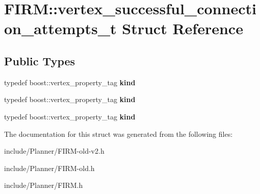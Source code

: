 \hypertarget{struct_f_i_r_m_1_1vertex__successful__connection__attempts__t}{\section{\-F\-I\-R\-M\-:\-:vertex\-\_\-successful\-\_\-connection\-\_\-attempts\-\_\-t \-Struct \-Reference}
\label{struct_f_i_r_m_1_1vertex__successful__connection__attempts__t}
}
\subsection*{\-Public \-Types}
\begin{DoxyCompactItemize}
\item 
\hypertarget{struct_f_i_r_m_1_1vertex__successful__connection__attempts__t_a733ba6f888f1adc641d746377eb13eec}{typedef boost\-::vertex\-\_\-property\-\_\-tag {\bfseries kind}}\label{struct_f_i_r_m_1_1vertex__successful__connection__attempts__t_a733ba6f888f1adc641d746377eb13eec}

\item 
\hypertarget{struct_f_i_r_m_1_1vertex__successful__connection__attempts__t_a733ba6f888f1adc641d746377eb13eec}{typedef boost\-::vertex\-\_\-property\-\_\-tag {\bfseries kind}}\label{struct_f_i_r_m_1_1vertex__successful__connection__attempts__t_a733ba6f888f1adc641d746377eb13eec}

\item 
\hypertarget{struct_f_i_r_m_1_1vertex__successful__connection__attempts__t_a733ba6f888f1adc641d746377eb13eec}{typedef boost\-::vertex\-\_\-property\-\_\-tag {\bfseries kind}}\label{struct_f_i_r_m_1_1vertex__successful__connection__attempts__t_a733ba6f888f1adc641d746377eb13eec}

\end{DoxyCompactItemize}


\-The documentation for this struct was generated from the following files\-:\begin{DoxyCompactItemize}
\item 
include/\-Planner/\-F\-I\-R\-M-\/old-\/v2.\-h\item 
include/\-Planner/\-F\-I\-R\-M-\/old.\-h\item 
include/\-Planner/\-F\-I\-R\-M.\-h\end{DoxyCompactItemize}
